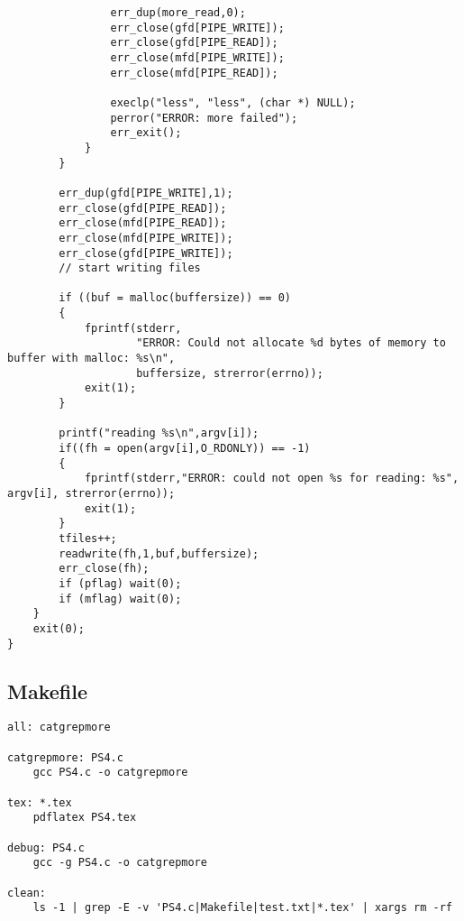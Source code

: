 \documentclass[12pt]{article}
\begin{document}
\begin{lstlisting}
                err_dup(more_read,0);
                err_close(gfd[PIPE_WRITE]);
                err_close(gfd[PIPE_READ]);
                err_close(mfd[PIPE_WRITE]);
                err_close(mfd[PIPE_READ]);

                execlp("less", "less", (char *) NULL);
                perror("ERROR: more failed");
                err_exit();
            }
        }

        err_dup(gfd[PIPE_WRITE],1);
        err_close(gfd[PIPE_READ]);
        err_close(mfd[PIPE_READ]);
        err_close(mfd[PIPE_WRITE]);
        err_close(gfd[PIPE_WRITE]);
        // start writing files
        
        if ((buf = malloc(buffersize)) == 0)
        {
            fprintf(stderr, 
                    "ERROR: Could not allocate %d bytes of memory to buffer with malloc: %s\n", 
                    buffersize, strerror(errno));
            exit(1);
        }
    
        printf("reading %s\n",argv[i]);
        if((fh = open(argv[i],O_RDONLY)) == -1)
        {
            fprintf(stderr,"ERROR: could not open %s for reading: %s", argv[i], strerror(errno));
            exit(1);
        }
        tfiles++;
        readwrite(fh,1,buf,buffersize);
        err_close(fh);
        if (pflag) wait(0);
        if (mflag) wait(0);
    }
    exit(0);
}

\end{lstlisting}

\subsection{Makefile}

\begin{lstlisting}
all: catgrepmore

catgrepmore: PS4.c
    gcc PS4.c -o catgrepmore

tex: *.tex
    pdflatex PS4.tex

debug: PS4.c
    gcc -g PS4.c -o catgrepmore

clean:
    ls -1 | grep -E -v 'PS4.c|Makefile|test.txt|*.tex' | xargs rm -rf
\end{lstlisting}
\end{document}
